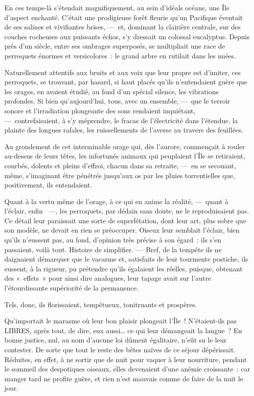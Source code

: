 \documentclass[french,twoside]{book} %
\newcommand{\bibl}[1]{{\RaggedLeft{#1}\par\bigskip}}
\begin{document}
\bibl{(\emph{Bulletins scientifiques de septembre 1887}.)}
\noindent En ces temps-là s’étendait magnifiquement, au sein d’idéals océans, une Île d’aspect enchanté. C’était une prodigieuse forêt fleurie qu’un Pacifique éventait de ses salines et vivifiantes brises, — et, dominant la clairière centrale, sur des couches rocheuses aux puissants échos, s’y dressait un colossal eucalyptus. Depuis près d’un siècle, entre ses ombrages superposés, se multipliait une race de perroquets énormes et versicolores : le grand arbre en rutilait dans les nuées.\par
   Naturellement attentifs aux bruits et aux voix que leur propre est d’imiter, ces perroquets, se trouvant, par hasard, si haut placés qu’ils n’entendaient guère que les orages, en avaient étudié, au fond d’un spécial silence, les vibrations profondes. Si bien qu’aujourd’hui, tous, avec un ensemble, — que le terroir sonore et l’irradiation plongeante des sons rendaient inquiétant, — contrefaisaient, à s’y méprendre, le fracas de l’électricité dans l’étendue, la plainte des longues rafales, les ruissellements de l’averse au travers des feuillées.\par
Au grondement de cet interminable orage qui, dès l’aurore, commençait à rouler au-dessus de leurs têtes, les infortunés animaux qui peuplaient l’Île se retiraient, courbés, dolents et pleins d’effroi, chacun dans sa retraite, — en se secouant, même, s’imaginant être pénétrés jusqu’aux os par les pluies torrentielles que, positivement, ils entendaient.\par
Quant à la vertu même de l’orage, à ce qui en anime la réalité, — quant à l’éclair, enfin  —, les perroquets, par dédain sans doute, ne le reproduisaient   pas. Ce détail leur paraissait une sorte de superfétation, dont leur art, plus sobre que son modèle, ne devait en rien se préoccuper. Oiseux leur semblait l’éclair, bien qu’ils n’eussent pas, au fond, d’opinion très précise à son égard : ils s’en passaient, voilà tout. Histoire de simplifier. — Bref, de la tempête ils ne daignaient démarquer que le vacarme et, satisfaits de leur tourmente postiche, ils eussent, à la rigueur, pu prétendre qu’ils égalaient les réelles, puisque, obtenant des « effets » pour ainsi dire analogues, leur tapage avait sur l’autre l’étourdissante supériorité de la permanence.\par
Tels, donc, ils florissaient, tempêtueux, tonitruants et prospères.\par
Qu’importait le marasme où leur bon plaisir plongeait l’Île ! N’étaient-ils pas LIBRES, après tout, de dire, eux aussi… ce qui leur démangeait la langue ? En bonne justice, nul, au nom d’aucune loi dûment égalitaire, n’eût su le leur contester. De sorte que tout le reste des bêtes naïves de ce séjour dépérissait. Réduites, en effet, à ne sortir que de nuit pour vaquer à leur   nourriture, pendant le sommeil des despotiques oiseaux, elles devenaient d’une anémie croissante : car manger tard ne profite guère, et rien n’est mauvais comme de faire de la nuit le jour.\par
\end{document}

